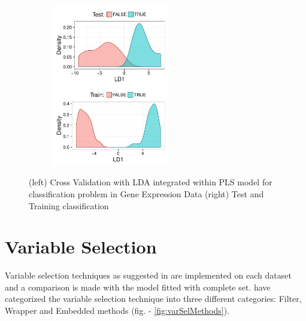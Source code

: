 \documentclass[10pt, a4paper]{article}\usepackage[]{graphicx}\usepackage[]{color}
\begin{document}
\begin{figure}[H]
\begin{subfigure}[t]{0.7\textwidth}
{
    }
\end{subfigure}
\hfill
\begin{subfigure}[t]{0.25\textwidth}
    \includegraphics[height = 2.8in]{figure/classifPlot}
\end{subfigure}
\caption{(left) Cross Validation with LDA integrated within PLS model for classification problem in Gene Expression Data (right) Test and Training classification}
\label{fig:cvloop}
\end{figure}


\section{Variable Selection}

Variable selection techniques as suggested in \citet{mehmood2012review} are implemented on each dataset and a comparison is made with the model fitted with complete set. \citet{mehmood2012review} have categorized the variable selection technique into three different categories: Filter, Wrapper and Embedded methods (fig. - \ref{fig:varSelMethods}). 
\end{document}
